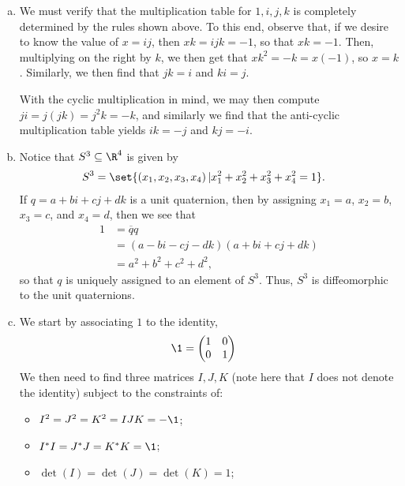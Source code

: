 \documentclass[10pt]{mypackage}
\begin{document}
\begin{solution}\hfill
  \begin{enumerate}[(a)]
    \item We must verify that the multiplication table for $ 1,i,j,k $ is completely determined by the rules shown above. To this end, observe that, if we desire to know the value of $ x = ij $, then $ xk = ijk = -1 $, so that $ xk = -1 $. Then, multiplying on the right by $k$, we then get that $ xk^2 = -k = x\left( -1 \right) $, so $x = k$. Similarly, we then find that $ jk = i $ and $ ki = j $.\newline

      With the cyclic multiplication in mind, we may then compute $ ji = j\left( jk \right) =j^2 k = -k$, and similarly we find that the anti-cyclic multiplication table yields $ ik = -j $ and $ kj = -i $.
    \item Notice that $S^{3}\subseteq \R^{4}$ is given by
      \begin{align*}
        S^{3} &= \set{\left( x_1,x_2,x_3,x_4 \right) | x_1^2 + x_2^2 + x_3^2 + x_4^2 = 1}.
      \end{align*}
      If $q = a + bi + cj + dk$ is a unit quaternion, then by assigning $x_1 = a$, $x_2 = b$, $x_3 = c$, and $x_4 = d$, then we see that
      \begin{align*}
        1 &= \overline{q} q\\
          &= \left( a -bi-cj-dk \right)\left( a + bi + cj + dk \right)\\
          &= a^2 + b^2 + c^2 + d^2,
      \end{align*}
      so that $q$ is uniquely assigned to an element of $S^{3}$. Thus, $S^{3}$ is diffeomorphic to the unit quaternions.
    \item We start by associating $1$ to the identity,
      \begin{align*}
        \1 &= \begin{pmatrix}1 & 0 \\ 0 & 1\end{pmatrix}
      \end{align*}
      We then need to find three matrices $I,J,K$ (note here that $I$ does not denote the identity) subject to the constraints of:
      \begin{itemize}
        \item $I^2 = J^2 = K^2 = IJK = -\1$;
        \item $I^{\ast}I = J^{\ast}J = K^{\ast}K = \1$;
        \item $\det\left( I \right) = \det\left( J \right) = \det\left( K \right) = 1$;
      \end{itemize}
  \end{enumerate}
\end{solution}
\end{document}
